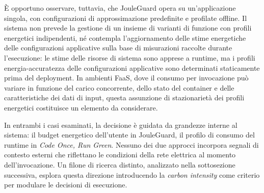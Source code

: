 È opportuno osservare, tuttavia, che JouleGuard opera su
un'applicazione singola, con configurazioni di approssimazione
predefinite e profilate offline. Il sistema non prevede la gestione di
un insieme di varianti di funzione con profili energetici indipendenti,
né contempla l'aggiornamento delle stime energetiche delle
configurazioni applicative sulla base di misurazioni raccolte durante
l'esecuzione: le stime delle risorse di sistema sono apprese a runtime,
ma i profili energia-accuratezza delle configurazioni applicative sono
determinati staticamente prima del deployment. In ambienti FaaS, dove il
consumo per invocazione può variare in funzione del carico concorrente,
dello stato del container e delle caratteristiche dei dati di input,
questa assunzione di stazionarietà dei profili energetici costituisce
un elemento da considerare.

\vspace{0.5em}

In entrambi i casi esaminati, la decisione è guidata da grandezze interne al
sistema: il budget energetico dell'utente in JouleGuard, il profilo
di consumo del runtime in \emph{Code Once, Run Green}. Nessuno dei
due approcci incorpora segnali di contesto esterni che riflettano le
condizioni della rete elettrica al momento dell'invocazione. Un filone
di ricerca distinto, analizzato nella sottosezione successiva, esplora
questa direzione introducendo la \emph{carbon intensity} come criterio
per modulare le decisioni di esecuzione.